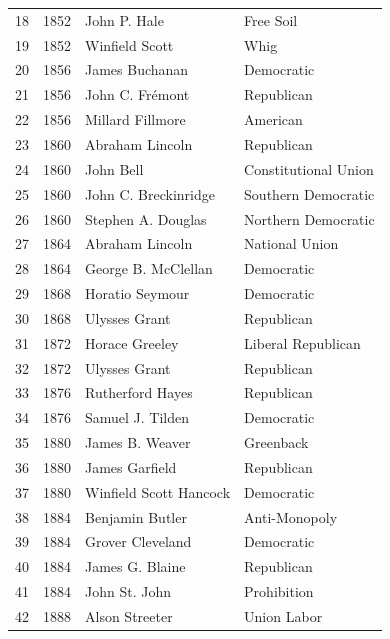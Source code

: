 \documentclass[
  letterpaper,
  DIV=11,
  numbers=noendperiod]{scrreprt}
\begin{document}
\begin{tabular}{lrll}
18  &  1852 &            John P. Hale &              Free Soil \\
19  &  1852 &          Winfield Scott &                   Whig \\
20  &  1856 &          James Buchanan &             Democratic \\
21  &  1856 &         John C. Frémont &             Republican \\
22  &  1856 &        Millard Fillmore &               American \\
23  &  1860 &         Abraham Lincoln &             Republican \\
24  &  1860 &               John Bell &   Constitutional Union \\
25  &  1860 &    John C. Breckinridge &    Southern Democratic \\
26  &  1860 &      Stephen A. Douglas &    Northern Democratic \\
27  &  1864 &         Abraham Lincoln &         National Union \\
28  &  1864 &     George B. McClellan &             Democratic \\
29  &  1868 &         Horatio Seymour &             Democratic \\
30  &  1868 &           Ulysses Grant &             Republican \\
31  &  1872 &          Horace Greeley &     Liberal Republican \\
32  &  1872 &           Ulysses Grant &             Republican \\
33  &  1876 &        Rutherford Hayes &             Republican \\
34  &  1876 &        Samuel J. Tilden &             Democratic \\
35  &  1880 &         James B. Weaver &              Greenback \\
36  &  1880 &          James Garfield &             Republican \\
37  &  1880 &  Winfield Scott Hancock &             Democratic \\
38  &  1884 &         Benjamin Butler &          Anti-Monopoly \\
39  &  1884 &        Grover Cleveland &             Democratic \\
40  &  1884 &         James G. Blaine &             Republican \\
41  &  1884 &           John St. John &            Prohibition \\
42  &  1888 &          Alson Streeter &            Union Labor \\

\end{tabular}
\end{document}
